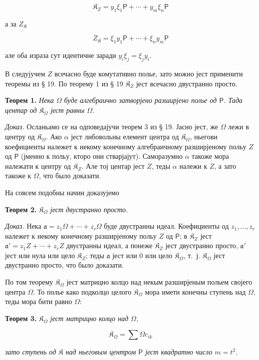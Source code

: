 \documentclass[11pt]{article}
\begin{document}
\[
\mathfrak K_Z=y_1\xi_1\mathsf P+\cdots+y_m\xi_n\mathsf P
\]

а за \(Z_{\mathfrak K}\)

\[
Z_{\mathfrak K}=\xi_1y_1\mathsf P+\cdots+\xi_ny_m\mathsf P
\]

але оба израза сут идентичне заради \(y_i\xi_j=\xi_jy_i\).

В следујучем \(Z\) всечасно буде комутативно полье, зато можно јест применити теоремы из § 19. По теорему 1 из § 19 \(\mathfrak K_Z\) јест всечасно двустранно просто.

\textbf{Теорем 1.} \emph{Нека \(\Omega\) буде алгебраично затворјено разширјено полье од \(\mathsf P\). Тада центар од \(\mathfrak K_\Omega\) јест равны \(\Omega\).}

\emph{Доказ.} Осланьамо се на одповедајучи теорем 3 из § 19. Јасно јест, же \(\Omega\) лежи в центру од \(\mathfrak K_\Omega\). Ако \(\alpha\) јест либовольны елемент центра од \(\mathfrak K_\Omega\), ньегови коефициенты належет к некому конечному алгебраичному разширјеному польу \(Z\) од \(\mathsf P\) (јменно к польу, кторо они стварјајут). Саморазумно \(\alpha\) такоже мора належати к центру од \(\mathfrak K_Z\). Але тој центар јест \(Z\), теды \(\alpha\) належи к \(Z\), а зато такоже к \(\Omega\), что было доказати.

На совсем подобны начин доказујемо

\textbf{Теорем 2.} \emph{\(\mathfrak K_\Omega\) јест двустранно просто.}

\emph{Доказ.} Нека \(\mathfrak a=z_1\Omega+\cdots+z_r\Omega\) буде двустранны идеал. Коефициенты од \(z_1,\ldots,z_r\) належет к некому конечному разширјеному польу \(Z\) од \(\mathsf P\); в \(\mathfrak K_Z\) јест \(\mathfrak a'=z_1Z+\cdots+z_rZ\) двустранны идеал, а понеже \(\mathfrak K_Z\) јест двустранно просто, \(\mathfrak a'\) јест или нула или цело \(\mathfrak K_Z\); теды \(\mathfrak a\) јест или 0 или цело \(\mathfrak K_\Omega\), т.~ј. \(\mathfrak K_\Omega\) јест двустранно просто, что было доказати.

По том теорему \(\mathfrak K_\Omega\) јест матрицно колцо над некым разширјеным польем својего центра \(\Omega\). То полье како подколцо целого \(\mathfrak K_\Omega\) мора имети конечны ступень над \(\Omega\), теды мора бити равно \(\Omega\):

\textbf{Теорем 3.} \emph{\(\mathfrak K_\Omega\) јест матрицно колцо над \(\Omega\),}

\[
\mathfrak K_\Omega=\sum\Omega c_{ik}
\]

\emph{зато ступень од \(\mathfrak K\) над ньеговым центром \(\mathsf P\) јест квадратно число \(m=t^2\).}
\end{document}
